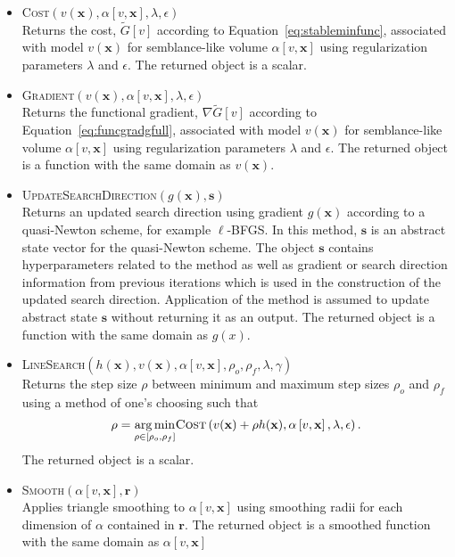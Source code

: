 \begin{itemize}
	\item \textsc{Cost}$\left(v(\mathbf{x}),\alpha \left[v,\mathbf{x}\right],\lambda,\epsilon \right)$ \\
	Returns the cost, $\tilde{G}[v]$ according to Equation~\ref{eq:stableminfunc}, associated  with model $v(\mathbf{x})$ for semblance-like volume $\alpha \left[v,\mathbf{x}\right]$ using regularization parameters $\lambda$ and $\epsilon$.  The returned object is a scalar.
	\item \textsc{Gradient}$\left( v(\mathbf{x}),\alpha\left[v,\mathbf{x} \right], \lambda, \epsilon \right)$ \\ Returns the functional gradient, $\nabla \tilde{G}[v]$ according to Equation~\ref{eq:funcgradgfull}, associated with model $v(\mathbf{x})$ for semblance-like volume $\alpha \left[v,\mathbf{x} \right]$ using regularization parameters $\lambda$ and $\epsilon$.  The returned object is a function with the same domain as $v(\mathbf{x})$.
	\item \textsc{UpdateSearchDirection}$\left( g(\mathbf{x}), \mathbf{s} \right)$ \\ Returns an updated search direction using gradient $g(\mathbf{x})$ according to a quasi-Newton scheme, for example $\ell$-BFGS. In this method, $\mathbf{s}$ is an abstract state vector for the quasi-Newton scheme.  The object $\mathbf{s}$ contains hyperparameters related to the method as well as gradient or search direction information from previous iterations which is used in the construction of the updated search direction.  Application of the method is assumed to update abstract state $\mathbf{s}$ without returning it as an output.  The returned object is a function with the same domain as $g(x)$.
	\item \textsc{LineSearch}$\left(h(\mathbf{x}),v(\mathbf{x}),\alpha \left[v,\mathbf{x}\right], \rho_{o}, \rho_{f}, \lambda, \gamma \right)$ \\ Returns the step size $\rho$ between minimum and maximum step sizes $\rho_{o}$ and $\rho_{f}$ using a method of one's choosing such that
	\begin{equation}
		\label{eq:lineasearch}
		\rho = \underset{\rho \in \left[\rho_{o}, \rho_{f} \right]}{\arg \min} \textsc{Cost}\left( v(\mathbf{x})+\rho h(\mathbf{x}), \alpha \left[v,\mathbf{x}\right], \lambda, \epsilon \right).
	\end{equation}
	The returned object is a scalar.
	\item \textsc{Smooth}$\left( \alpha \left[v,\mathbf{x}\right], \mathbf{r} \right)$ \\ Applies triangle smoothing to $\alpha \left[v,\mathbf{x}\right]$ using smoothing radii for each dimension of $\alpha$ contained in $\mathbf{r}$.  The returned object is a smoothed function with the same domain as $\alpha \left[v,\mathbf{x}\right]$
\end{itemize}

